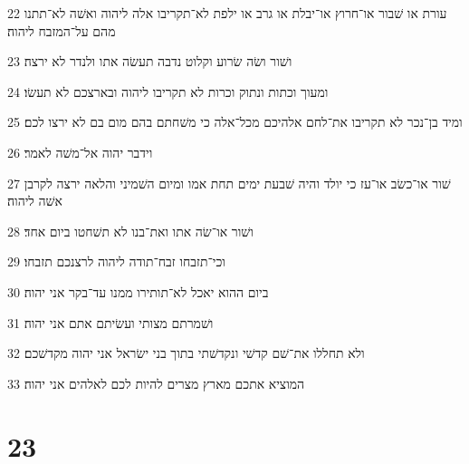 \par 22 עורת או שׁבור או־חרוץ או־יבלת או גרב או ילפת לא־תקריבו אלה ליהוה ואשׁה לא־תתנו מהם על־המזבח ליהוה׃
\par 23 ושׁור ושׂה שׂרוע וקלוט נדבה תעשׂה אתו ולנדר לא ירצה׃
\par 24 ומעוך וכתות ונתוק וכרות לא תקריבו ליהוה ובארצכם לא תעשׂו׃
\par 25 ומיד בן־נכר לא תקריבו את־לחם אלהיכם מכל־אלה כי משׁחתם בהם מום בם לא ירצו לכם׃
\par 26 וידבר יהוה אל־משׁה לאמר׃
\par 27 שׁור או־כשׂב או־עז כי יולד והיה שׁבעת ימים תחת אמו ומיום השׁמיני והלאה ירצה לקרבן אשׁה ליהוה׃
\par 28 ושׁור או־שׂה אתו ואת־בנו לא תשׁחטו ביום אחד׃
\par 29 וכי־תזבחו זבח־תודה ליהוה לרצנכם תזבחו׃
\par 30 ביום ההוא יאכל לא־תותירו ממנו עד־בקר אני יהוה׃
\par 31 ושׁמרתם מצותי ועשׂיתם אתם אני יהוה׃
\par 32 ולא תחללו את־שׁם קדשׁי ונקדשׁתי בתוך בני ישׂראל אני יהוה מקדשׁכם׃
\par 33 המוציא אתכם מארץ מצרים להיות לכם לאלהים אני יהוה׃

\chapter{23}

